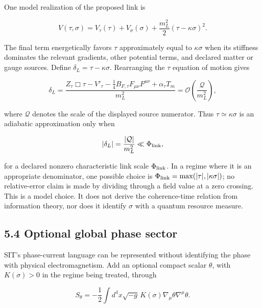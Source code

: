 \documentclass[
  american,
  11pt,
  letterpaper,
]{article}
\begin{document}
One model realization of the proposed link is

\begin{equation}
V(\tau,\sigma)=V_\tau(\tau)+V_\sigma(\sigma)
+\frac{m_L^2}{2}\left(\tau-\kappa\sigma\right)^2 .
\tag{8}
\end{equation}

The final term energetically favors \(\tau\) approximately equal to \(\kappa\sigma\) when its stiffness dominates the relevant gradients, other potential terms, and declared matter or gauge sources. Define \(\delta_L=\tau-\kappa\sigma\). Rearranging the \(\tau\) equation of motion gives

\begin{equation}
\delta_L=
\frac{Z_\tau\Box\tau-V'_\tau
-\frac14B_{F,\tau}F_{\mu\nu}F^{\mu\nu}
+\alpha_\tau T_m}{m_L^2}
=\mathcal{O}\!\left(\frac{\mathcal Q}{m_L^2}\right),
\tag{9}
\end{equation}

where \(\mathcal Q\) denotes the scale of the displayed source numerator. Thus \(\tau\simeq\kappa\sigma\) is an adiabatic approximation only when

\begin{equation}
|\delta_L|=\frac{|\mathcal Q|}{m_L^2}\ll\Phi_{\rm link},
\end{equation}

for a declared nonzero characteristic link scale \(\Phi_{\rm link}\). In a regime where it is an appropriate denominator, one possible choice is \(\Phi_{\rm link}=\max(|\tau|,|\kappa\sigma|)\); no relative-error claim is made by dividing through a field value at a zero crossing. This is a model choice. It does not derive the coherence-time relation from information theory, nor does it identify \(\sigma\) with a quantum resource measure.

\subsection{5.4 Optional global phase sector}\label{optional-global-phase-sector}

SIT's phase-current language can be represented without identifying the phase with physical electromagnetism. Add an optional compact scalar \(\theta\), with \(K(\sigma)>0\) in the regime being treated, through

\begin{equation}
S_\theta=-\frac12\int d^4x\sqrt{-g}\,
K(\sigma)\nabla_\mu\theta\nabla^\mu\theta .
\tag{10}
\end{equation}
\end{document}
